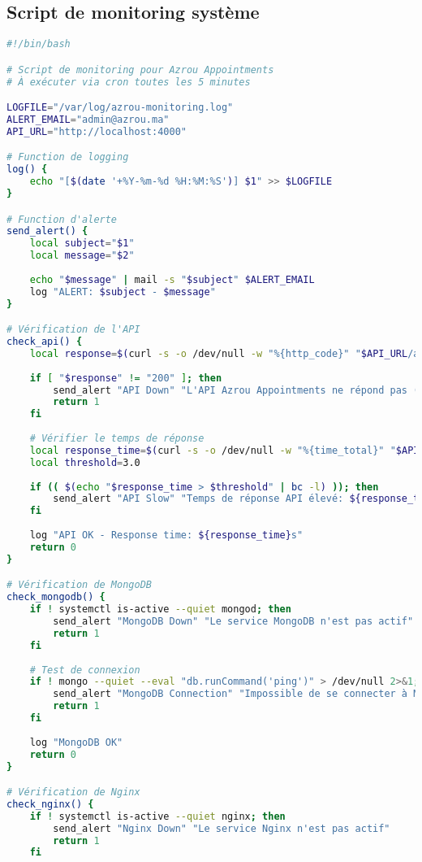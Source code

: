 \subsection{Script de monitoring système}

\begin{lstlisting}[language=bash, caption=monitor.sh - Monitoring complet du système]
#!/bin/bash

# Script de monitoring pour Azrou Appointments
# À exécuter via cron toutes les 5 minutes

LOGFILE="/var/log/azrou-monitoring.log"
ALERT_EMAIL="admin@azrou.ma"
API_URL="http://localhost:4000"

# Function de logging
log() {
    echo "[$(date '+%Y-%m-%d %H:%M:%S')] $1" >> $LOGFILE
}

# Function d'alerte
send_alert() {
    local subject="$1"
    local message="$2"
    
    echo "$message" | mail -s "$subject" $ALERT_EMAIL
    log "ALERT: $subject - $message"
}

# Vérification de l'API
check_api() {
    local response=$(curl -s -o /dev/null -w "%{http_code}" "$API_URL/api/health")
    
    if [ "$response" != "200" ]; then
        send_alert "API Down" "L'API Azrou Appointments ne répond pas (HTTP $response)"
        return 1
    fi
    
    # Vérifier le temps de réponse
    local response_time=$(curl -s -o /dev/null -w "%{time_total}" "$API_URL/api/health")
    local threshold=3.0
    
    if (( $(echo "$response_time > $threshold" | bc -l) )); then
        send_alert "API Slow" "Temps de réponse API élevé: ${response_time}s (seuil: ${threshold}s)"
    fi
    
    log "API OK - Response time: ${response_time}s"
    return 0
}

# Vérification de MongoDB
check_mongodb() {
    if ! systemctl is-active --quiet mongod; then
        send_alert "MongoDB Down" "Le service MongoDB n'est pas actif"
        return 1
    fi
    
    # Test de connexion
    if ! mongo --quiet --eval "db.runCommand('ping')" > /dev/null 2>&1; then
        send_alert "MongoDB Connection" "Impossible de se connecter à MongoDB"
        return 1
    fi
    
    log "MongoDB OK"
    return 0
}

# Vérification de Nginx
check_nginx() {
    if ! systemctl is-active --quiet nginx; then
        send_alert "Nginx Down" "Le service Nginx n'est pas actif"
        return 1
    fi
    

\end{lstlisting}
